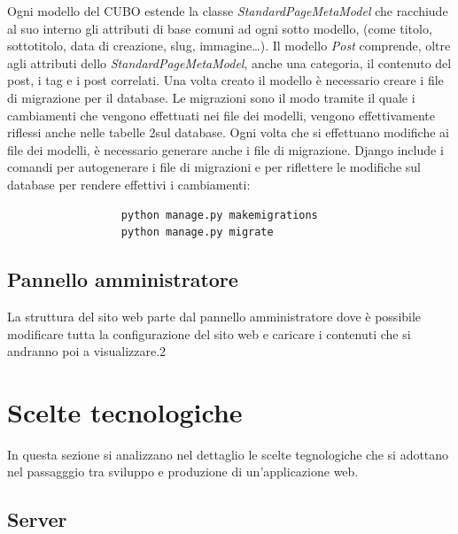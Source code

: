 \documentclass[12pt,a4paper]{article}
\begin{document}
Ogni modello del CUBO estende la classe \textit{StandardPageMetaModel} che racchiude al suo interno gli attributi di base comuni ad ogni sotto modello, (come titolo, sottotitolo, data di creazione, slug, immagine…).
Il modello \textit{Post} comprende, oltre agli attributi dello \textit{StandardPageMetaModel}, anche una categoria, il contenuto del post, i tag e i post correlati.
Una volta creato il modello è necessario creare i file di migrazione per il database.
Le migrazioni sono il modo tramite il quale i cambiamenti che vengono effettuati nei file dei modelli, vengono effettivamente riflessi anche nelle tabelle 2sul database.
Ogni volta che si effettuano modifiche ai file dei modelli, è necessario generare anche i file di migrazione. Django include i comandi per autogenerare i file di migrazioni e per riflettere le modifiche sul database per rendere effettivi i  cambiamenti:
\begin{verbatim}
                  python manage.py makemigrations
                  python manage.py migrate
\end{verbatim}




\subsection{Pannello amministratore}
La struttura del sito web parte dal pannello amministratore dove è possibile modificare tutta la configurazione del sito web e caricare i contenuti che si andranno poi a visualizzare.2



























\clearpage
\section{Scelte tecnologiche}
In questa sezione si analizzano nel dettaglio le scelte tegnologiche che si adottano nel passagggio tra sviluppo e produzione di un'applicazione web.

\subsection{Server}
\end{document}
